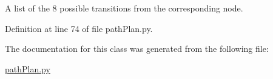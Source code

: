A list of the 8 possible transitions from the corresponding node. 



Definition at line 74 of file path\+Plan.\+py.



The documentation for this class was generated from the following file\+:\begin{DoxyCompactItemize}
\item 
\mbox{\hyperlink{path_plan_8py}{path\+Plan.\+py}}\end{DoxyCompactItemize}
